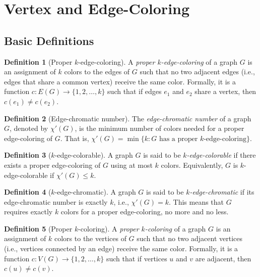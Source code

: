 \documentclass{article}
\theoremstyle{definition}
\newtheorem{definition}{Definition}
\begin{document}
\pagebreak
\newpage
\clearpage

\section{Vertex and Edge-Coloring}
\subsection{Basic Definitions}

\begin{definition}[Proper $k$-edge-coloring]
A \emph{proper $k$-edge-coloring} of a graph $G$ is an assignment of $k$ colors to the edges of $G$ such that no two adjacent edges (i.e., edges that share a common vertex) receive the same color. Formally, it is a function $c: E(G) \rightarrow \{1,2,\ldots,k\}$ such that if edges $e_1$ and $e_2$ share a vertex, then $c(e_1) \neq c(e_2)$.
\end{definition}

\begin{definition}[Edge-chromatic number]
The \emph{edge-chromatic number} of a graph $G$, denoted by $\chi'(G)$, is the minimum number of colors needed for a proper edge-coloring of $G$. That is, $\chi'(G) = \min\{k : G \text{ has a proper $k$-edge-coloring}\}$.
\end{definition}

\begin{definition}[$k$-edge-colorable]
A graph $G$ is said to be \emph{$k$-edge-colorable} if there exists a proper edge-coloring of $G$ using at most $k$ colors. Equivalently, $G$ is $k$-edge-colorable if $\chi'(G) \leq k$.
\end{definition}

\begin{definition}[$k$-edge-chromatic]
A graph $G$ is said to be \emph{$k$-edge-chromatic} if its edge-chromatic number is exactly $k$, i.e., $\chi'(G) = k$. This means that $G$ requires exactly $k$ colors for a proper edge-coloring, no more and no less.
\end{definition}

\begin{definition}[Proper $k$-coloring]
A \emph{proper $k$-coloring} of a graph $G$ is an assignment of $k$ colors to the vertices of $G$ such that no two adjacent vertices (i.e., vertices connected by an edge) receive the same color. Formally, it is a function $c: V(G) \rightarrow \{1,2,\ldots,k\}$ such that if vertices $u$ and $v$ are adjacent, then $c(u) \neq c(v)$.
\end{definition}
\end{document}
